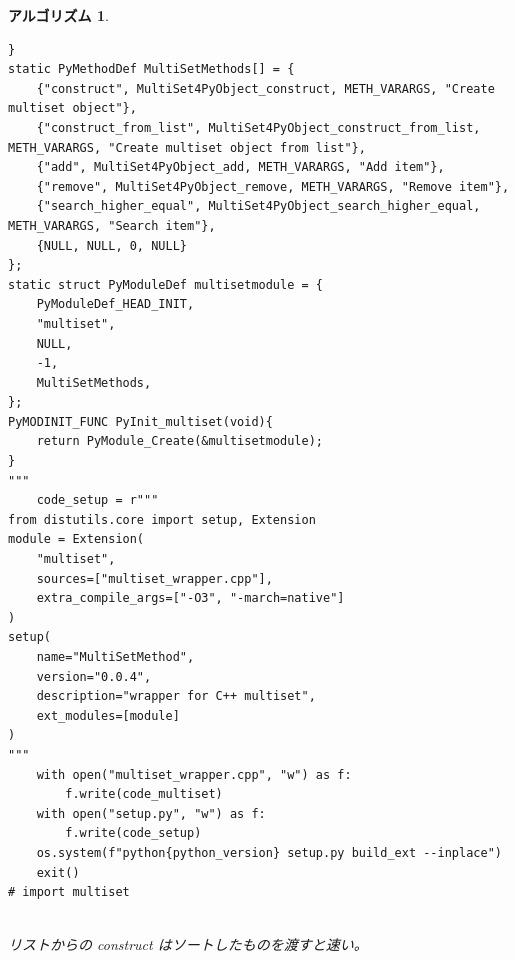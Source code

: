 \documentclass[12pt, a4j]{ltjsarticle}
\newtheorem{alg}[thm]{アルゴリズム}
\newcommand*{\SS}{\vspace{1cm}}
\begin{document}
\begin{alg}
\begin{lstlisting}
}
static PyMethodDef MultiSetMethods[] = {
    {"construct", MultiSet4PyObject_construct, METH_VARARGS, "Create multiset object"},
    {"construct_from_list", MultiSet4PyObject_construct_from_list, METH_VARARGS, "Create multiset object from list"},
    {"add", MultiSet4PyObject_add, METH_VARARGS, "Add item"},
    {"remove", MultiSet4PyObject_remove, METH_VARARGS, "Remove item"},
    {"search_higher_equal", MultiSet4PyObject_search_higher_equal, METH_VARARGS, "Search item"},
    {NULL, NULL, 0, NULL}
};
static struct PyModuleDef multisetmodule = {
    PyModuleDef_HEAD_INIT,
    "multiset",
    NULL,
    -1,
    MultiSetMethods,
};
PyMODINIT_FUNC PyInit_multiset(void){
    return PyModule_Create(&multisetmodule);
}
"""
    code_setup = r"""
from distutils.core import setup, Extension
module = Extension(
    "multiset",
    sources=["multiset_wrapper.cpp"],
    extra_compile_args=["-O3", "-march=native"]
)
setup(
    name="MultiSetMethod",
    version="0.0.4",
    description="wrapper for C++ multiset",
    ext_modules=[module]
)
"""
    with open("multiset_wrapper.cpp", "w") as f:
        f.write(code_multiset)
    with open("setup.py", "w") as f:
        f.write(code_setup)
    os.system(f"python{python_version} setup.py build_ext --inplace")
    exit()
# import multiset
\end{lstlisting}\quad\\
リストからの construct はソートしたものを渡すと速い。
\end{alg}

\SS
\end{document}
